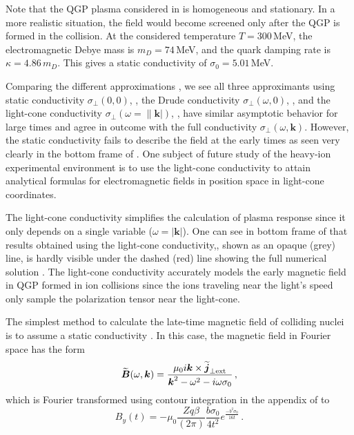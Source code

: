 Note that the QGP plasma considered in  is homogeneous and stationary. In a more realistic situation, the field would become screened only after the QGP is formed in the collision. At the considered temperature $T = 300$\,MeV, the electromagnetic Debye mass is $m_D = 74\,$MeV, and the quark damping rate is $\kappa = 4.86\,m_D$. This gives a static conductivity of $\sigma_0 = 5.01\,$MeV. 

Comparing the different approximations   , we see  all three approximants using static conductivity $\sigma_\bot(0,0)$, , the Drude conductivity $\sigma_\bot(\omega,0)$, ,  and the light-cone conductivity $\sigma_\bot(\omega=\|\boldsymbol{k}|)$, ,  have similar asymptotic behavior for large times and agree in outcome with the full conductivity $\sigma_\perp(\omega,\boldsymbol{k})$. However, the static conductivity fails to describe the field at the early times as seen very clearly in the bottom frame of . One subject of future study of the heavy-ion experimental environment is to use the light-cone conductivity to attain analytical formulas for electromagnetic fields in position space in light-cone coordinates.

The light-cone conductivity  simplifies the calculation of plasma response since it only depends on a single variable ($\omega = |\boldsymbol{k}|$). One can see in bottom frame of  that results obtained using the light-cone conductivity,, shown as an opaque (grey) line, is hardly visible under the  dashed (red) line showing the full numerical solution . The light-cone conductivity accurately models the early magnetic field in QGP formed in ion collisions since the ions traveling near the light's speed only sample the polarization tensor near the light-cone. 

The simplest method to calculate the late-time magnetic field of colliding nuclei is to assume a static conductivity \cite{Tuchin:2013apa}. In this case, the magnetic field in Fourier space has the form
\begin{equation}\label{eq:bstat}
    \widetilde{\boldsymbol{B}}(\omega,\boldsymbol{k}) = \frac{ \mu_0 i\boldsymbol{k} \times \widetilde{\boldsymbol{j}}_{\perp \text{ext}}}{\boldsymbol{k}^2 - \omega^2 - i\omega\sigma_0}\,,
\end{equation}
which is Fourier transformed using contour integration in the appendix of \cite{Grayson:2022asf} to
\begin{equation}\label{eq:banalyticapp}
   B_y(t) = -\mu_0 \frac{ Zq \beta }{(2\pi)} \frac{ b\sigma_0}{4t^2} e^{\frac{-b^2 \sigma_0}{16 t}}\,.
\end{equation}


